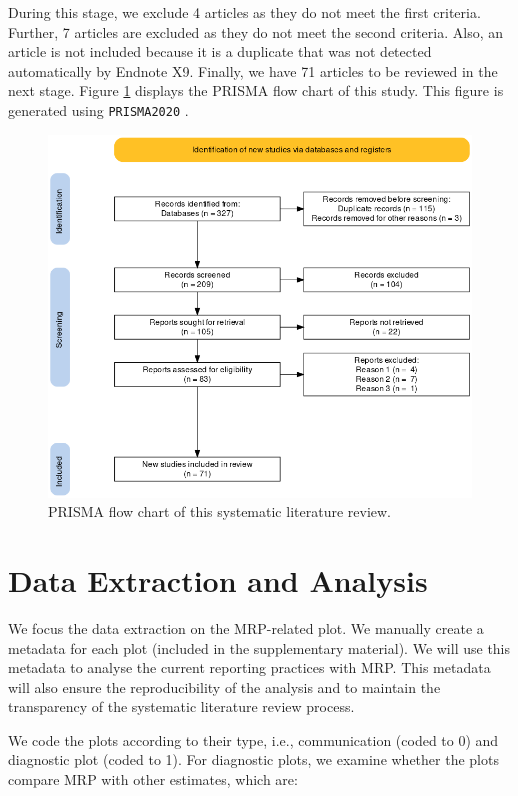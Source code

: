 \documentclass{monashthesis}
\begin{document}
During this stage, we exclude 4 articles as they do not meet the first criteria. Further, 7 articles are excluded as they do not meet the second criteria. Also, an article is not included because it is a duplicate that was not detected automatically by Endnote X9. Finally, we have 71 articles to be reviewed in the next stage. Figure \ref{fig:prisma-flowchart} displays the PRISMA flow chart of this study. This figure is generated using \texttt{PRISMA2020} \autocite{prisma2020}.

\begin{figure}
\includegraphics[width=0.9\linewidth]{figures/prisma_fc} \caption{PRISMA flow chart of this systematic literature review.}\label{fig:prisma-flowchart}
\end{figure}

\hypertarget{data-extraction-and-analysis}{%
\section{Data Extraction and Analysis}\label{data-extraction-and-analysis}}

We focus the data extraction on the MRP-related plot. We manually create a metadata for each plot (included in the supplementary material). We will use this metadata to analyse the current reporting practices with MRP. This metadata will also ensure the reproducibility of the analysis and to maintain the transparency of the systematic literature review process.

We code the plots according to their type, i.e., communication (coded to 0) and diagnostic plot (coded to 1). For diagnostic plots, we examine whether the plots compare MRP with other estimates, which are:
\end{document}
